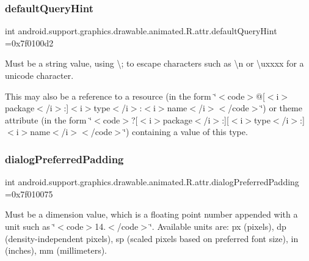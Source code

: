 \subsubsection{\texorpdfstring{default\+Query\+Hint}{defaultQueryHint}}
{\footnotesize\ttfamily int android.\+support.\+graphics.\+drawable.\+animated.\+R.\+attr.\+default\+Query\+Hint =0x7f0100d2\hspace{0.3cm}{\ttfamily [static]}}

Must be a string value, using \textquotesingle{}\textbackslash{};\textquotesingle{} to escape characters such as \textquotesingle{}\textbackslash{}n\textquotesingle{} or \textquotesingle{}\textbackslash{}uxxxx\textquotesingle{} for a unicode character. 

This may also be a reference to a resource (in the form \char`\"{}$<$code$>$@\mbox{[}$<$i$>$package$<$/i$>$\+:\mbox{]}$<$i$>$type$<$/i$>$\+:$<$i$>$name$<$/i$>$$<$/code$>$\char`\"{}) or theme attribute (in the form \char`\"{}$<$code$>$?\mbox{[}$<$i$>$package$<$/i$>$\+:\mbox{]}\mbox{[}$<$i$>$type$<$/i$>$\+:\mbox{]}$<$i$>$name$<$/i$>$$<$/code$>$\char`\"{}) containing a value of this type. \mbox{\label{classandroid_1_1support_1_1graphics_1_1drawable_1_1animated_1_1R_1_1attr_a860729c36304ab5b3dde8d219e8cc5cc}} 
\subsubsection{\texorpdfstring{dialog\+Preferred\+Padding}{dialogPreferredPadding}}
{\footnotesize\ttfamily int android.\+support.\+graphics.\+drawable.\+animated.\+R.\+attr.\+dialog\+Preferred\+Padding =0x7f010075\hspace{0.3cm}{\ttfamily [static]}}

Must be a dimension value, which is a floating point number appended with a unit such as \char`\"{}$<$code$>$14.\+5sp$<$/code$>$\char`\"{}. Available units are\+: px (pixels), dp (density-\/independent pixels), sp (scaled pixels based on preferred font size), in (inches), mm (millimeters). 


